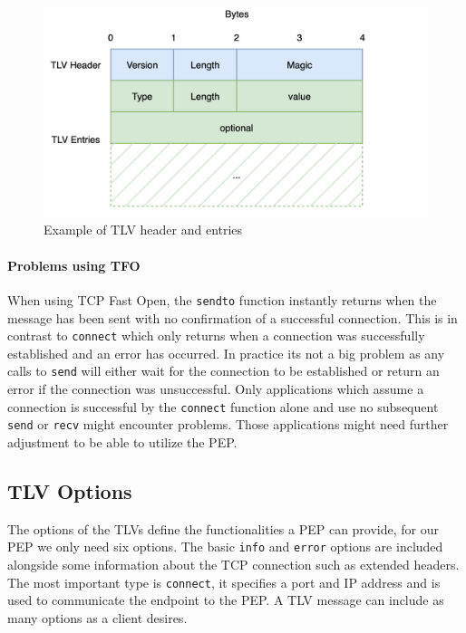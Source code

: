 \documentclass[a4paper,english, 12pt]{report}
\begin{document}
\begin{figure} %
	\centering
	\includegraphics[scale=0.35]{../diagrams/drawio/tlv.png}
  	\caption{Example of TLV header and entries}
  	\label{fig:tlv_example}
\end{figure}

\paragraph{Problems using TFO}
When using TCP Fast Open, the \verb|sendto| function instantly returns when the message has been sent with no confirmation of a successful connection. This is in contrast to \verb|connect| which only returns when a connection was successfully established and an error has occurred. In practice its not a big problem as any calls to \verb|send| will either wait for the connection to be established or return an error if the connection was unsuccessful. Only applications which assume a connection is successful by the \verb|connect| function alone and use no subsequent \verb|send| or \verb|recv| might encounter problems. Those applications might need further adjustment to be able to utilize the PEP.

\subsection{TLV Options}
The options of the TLVs define the functionalities a PEP can provide, for our PEP we only need six options. The basic \verb|info| and \verb|error| options are included alongside some information about the TCP connection such as extended headers. The most important type is \verb|connect|, it specifies a port and IP address and is used to communicate the endpoint to the PEP. A TLV message can include as many options as a client desires.
\end{document}
